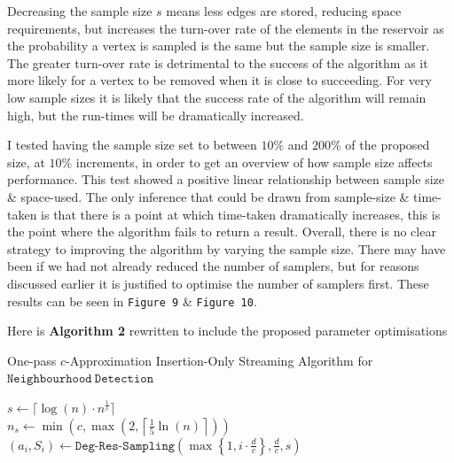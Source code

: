 \documentclass[11pt,twoside,a4paper]{report}
\begin{document}
\par Decreasing the sample size $s$ means less edges are stored, reducing space requirements, but increases the turn-over rate of the elements in the reservoir as the probability a vertex is sampled is the same but the sample size is smaller. The greater turn-over rate is detrimental to the success of the algorithm as it more likely for a vertex to be removed when it is close to succeeding. For very low sample sizes it is likely that the success rate of the algorithm will remain high, but the run-times will be dramatically increased.

\par I tested having the sample size set to between $10\%$ and $200\%$ of the proposed size, at $10\%$ increments, in order to get an overview of how sample size affects performance. This test showed a positive linear relationship between sample size \& space-used. The only inference that could be drawn from sample-size \& time-taken is that there is a point at which time-taken dramatically increases, this is the point where the algorithm fails to return a result. Overall, there is no clear strategy to improving the algorithm by varying the sample size. There may have been if we had not already reduced the number of samplers, but for reasons discussed earlier it is justified to optimise the number of samplers first. These results can be seen in \texttt{Figure 9} \& \texttt{Figure 10}.\\

\par Here is \textbf{Algorithm 2} rewritten to include the proposed parameter optimisations
\begin{algorithm}
	\caption{One-pass $c$-Approximation Insertion-Only Streaming Algorithm for $\mathtt{Neighbourhood\ Detection}$}
	$s\leftarrow\lceil\log(n)\cdot n^{\frac1c}\rceil$\\
	$n_s\leftarrow\min\left(c,\max\left(2,\left\lceil\frac15\ln(n)\right\rceil\right)\right)$\\
	 {
		$(a_i,S_i)\leftarrow\mathtt{Deg}\mbox{-}\mathtt{Res}\mbox{-}\mathtt{Sampling}\left(\max\left\{1,i\cdot\frac{d}{c}\right\},\frac{d}c,s\right)$
	}
\end{algorithm}

\end{document}
